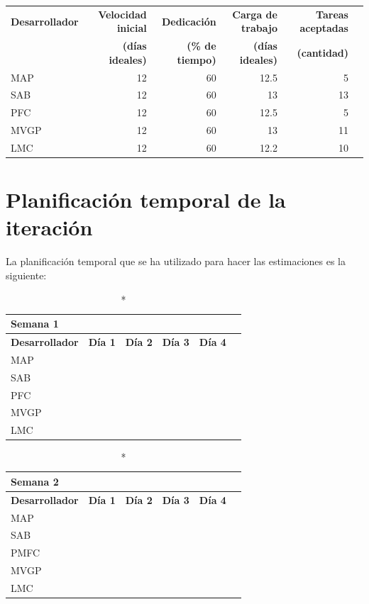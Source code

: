 \documentclass[11pt]{article}
\begin{document}
\begin{table}[H]
  \centering

  \begin{adjustbox}{width=\textwidth}
\begin{tabular}{lrrrrr}
  \toprule
  \textbf{Desarrollador} & \textbf{Velocidad inicial} & \textbf{Dedicación} & \textbf{Carga de trabajo} & \textbf{Tareas aceptadas} \\
  & \textbf{(días ideales)} & \textbf{(\% de tiempo)} & \textbf{(días ideales)} & \textbf{ (cantidad)}\\
  \midrule
  MAP & 12 & 60 & 12.5 & 5\\
  SAB & 12 & 60 & 13 & 13\\
  PFC & 12 & 60 & 12.5 & 5\\
  MVGP & 12 & 60 & 13 & 11\\
  LMC & 12 & 60 & 12.2 & 10\\
  \bottomrule
\end{tabular}
\end{adjustbox}
\end{table}

\section{Planificación temporal de la iteración}
La planificación temporal que se ha utilizado para hacer las estimaciones es la siguiente:


\begin{longtable}{lrrrrr}
  \caption*{Semana 1}\\
  \toprule
  \textbf{Desarrollador} & \textbf{Día 1} & \textbf{Día 2} & \textbf{Día 3} & \textbf{Día 4} \\
  \midrule
  MAP &  &  &  &  \\
  SAB &  &  &  & \\
  PFC \\
  MVGP & & \\
  LMC \\
  \bottomrule
\end{longtable}

\begin{longtable}{lrrrrr}
  \caption*{Semana 2}\\
  \toprule
  \textbf{Desarrollador} & \textbf{Día 1} & \textbf{Día 2} & \textbf{Día 3} & \textbf{Día 4} \\
  \midrule
  MAP &  & \\
  SAB &  & \\
  PMFC \\
  MVGP & & \\
  LMC \\
  \bottomrule
\end{longtable}
\end{document}
